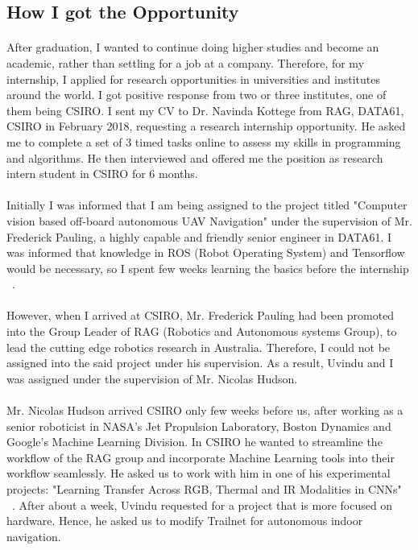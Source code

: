 
\subsection{How I got the Opportunity}

\paragraph{}
After graduation, I wanted to continue doing higher studies and become an academic, rather than settling for a job at a company. Therefore, for my internship, I applied for research opportunities in universities and institutes around the world. I got positive response from two or three institutes, one of them being CSIRO. I sent my CV to Dr. Navinda Kottege from RAG, DATA61, CSIRO in February 2018, requesting a research internship opportunity. He asked me to complete a set of 3 timed tasks online to assess my skills in programming and algorithms. He then interviewed and offered me the position as research intern student in CSIRO for 6 months.

\paragraph{}
Initially I was informed that I am being assigned to the project titled "Computer vision based off-board autonomous UAV Navigation" under the supervision of Mr. Frederick Pauling, a highly capable and friendly senior engineer in DATA61. I was informed that knowledge in ROS (Robot Operating System) and Tensorflow would be necessary, so I spent few weeks learning the basics before the internship ~\cite{mobile_cnn}.

\paragraph{}
However, when I arrived at CSIRO, Mr. Frederick Pauling had been promoted into the Group Leader of RAG (Robotics and Autonomous systems Group), to lead the cutting edge robotics research in Australia. Therefore, I could not be assigned into the said project under his supervision. As a result, Uvindu and I was assigned under the supervision of Mr. Nicolas Hudson.

\paragraph{}
Mr. Nicolas Hudson arrived CSIRO only few weeks before us, after working as a senior roboticist in NASA's Jet Propulsion Laboratory, Boston Dynamics and Google's Machine Learning Division. In CSIRO he wanted to streamline the workflow of the RAG group and incorporate Machine Learning tools into their workflow seamlessly. He asked us to work with him in one of his experimental projects: "Learning Transfer Across RGB, Thermal and IR Modalities in CNNs" ~\cite{cross_modal1} ~\cite{distill1}. After about a week, Uvindu requested for a project that is more focused on hardware. Hence, he asked us to modify Trailnet for autonomous indoor navigation.

